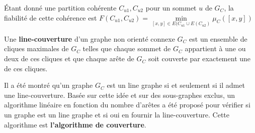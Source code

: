 \'Etant donn\'e une partition coh\'erente $C_{u1}, C_{u2}$ pour un sommet $u$ de $G_C$, la fiabilit\'e de cette coh\'erence est
$F(C_{u1}, C_{u2}) = \min\limits_{[x,y] \in E(C_{u1} \cup E(C_{u2} )}  \mu_{C}([x,y])$

\begin{definition}
Une {\bf line-couverture} d'un graphe non orient\'e connexe $G_C$ est un ensemble de cliques maximales de $G_C$ telles que chaque sommet de $G_C$ appartient \`a une ou deux de ces cliques et que chaque ar\^ete de $G_C$ soit couverte par exactement une de ces cliques.
\end{definition}

Il a \'et\'e montr\'e qu'un graphe $G_C$ est  un line graphe si et seulement si il admet une line-couverture.
Bas\'ee sur cette id\'ee et sur des sous-graphes exclus, un algorithme lin\'eaire en fonction du nombre d'ar\^etes a \'et\'e propos\'e pour v\'erifier  si un graphe est un line graphe et si oui en fournir la line-couverture.
Cette algorithme est {\bf l'algorithme de couverture}.


